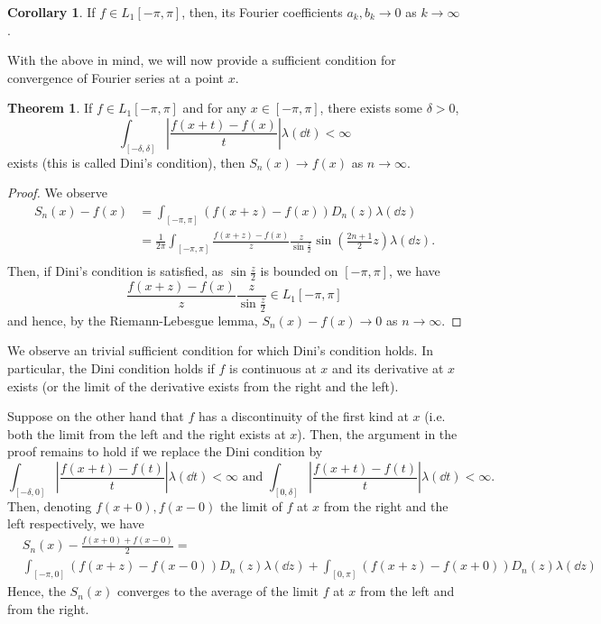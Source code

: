 \documentclass[]{article}
\theoremstyle{definition}
\newtheorem{theorem}{Theorem}
\newtheorem{corollary}{Corollary}[theorem]
\theoremstyle{definition}
\begin{document}
\begin{corollary}
  If \(f \in L_1[-\pi, \pi]\), then, its Fourier coefficients \(a_k, b_k \to 0\) 
  as \(k \to \infty\).
\end{corollary}

With the above in mind, we will now provide a sufficient condition for convergence of 
Fourier series at a point \(x\).

\begin{theorem}
  If \(f \in L_1[-\pi, \pi]\) and for any \(x \in [-\pi, \pi]\), there exists some \(\delta > 0\), 
  \[\int_{[-\delta, \delta]} \left|\frac{f(x + t) - f(x)}{t}\right| \lambda(\dd t) < \infty\]
  exists (this is called Dini's condition), then \(S_n(x) \to f(x)\) as \(n \to \infty\).
\end{theorem}
\begin{proof}
  We observe
  \[\begin{split}
    S_n(x) - f(x) & = \int_{[-\pi, \pi]} (f(x + z) - f(x)) D_n(z) \lambda(\dd z)\\
    & = \frac{1}{2\pi}\int_{[-\pi, \pi]} \frac{f(x + z) - f(x)}{z} 
      \frac{z}{\sin \frac{z}{2}} \sin \left(\frac{2 n + 1}{2}z\right)\lambda(\dd z).\\
  \end{split}\]
  Then, if Dini's condition is satisfied, as \(\sin \frac{z}{2}\) is bounded on 
  \([-\pi, \pi]\), we have 
  \[\frac{f(x + z) - f(x)}{z} \frac{z}{\sin \frac{z}{2}} \in L_1[-\pi, \pi]\]
  and hence, by the Riemann-Lebesgue lemma, \(S_n(x) - f(x) \to 0\) as 
  \(n \to \infty\).
\end{proof}

We observe an trivial sufficient condition for which Dini's condition holds. 
In particular, the Dini condition holds if \(f\) is continuous at \(x\) and its derivative at 
\(x\) exists (or the limit of the derivative exists from the right and the left).

Suppose on the other hand that \(f\) has a discontinuity of the first kind at 
\(x\) (i.e. both the limit from the left and the right exists at \(x\)). Then, 
the argument in the proof remains to hold if we replace the Dini condition by 
\[\int_{[-\delta, 0] } \left|\frac{f(x + t) - f(t)}{t}\right| \lambda(\dd t) < \infty
\text{ and } 
\int_{[0, \delta] } \left|\frac{f(x + t) - f(t)}{t}\right| \lambda(\dd t) < \infty.\]
Then, denoting \(f(x + 0), f(x - 0)\) the limit of \(f\) at \(x\) from the right and the 
left respectively, we have
\[\begin{split}
  &S_n(x) - \frac{f(x + 0) + f(x - 0)}{2} =\\ 
  &\int_{[-\pi, 0]} (f(x + z) - f(x - 0)) D_n(z) \lambda(\dd z)
 + \int_{[0, \pi]} (f(x + z) - f(x + 0)) D_n(z) \lambda(\dd z)
 \end{split}\]
Hence, the \(S_n(x)\) converges to the average of the limit \(f\) at \(x\) from 
the left and from the right.
\end{document}
